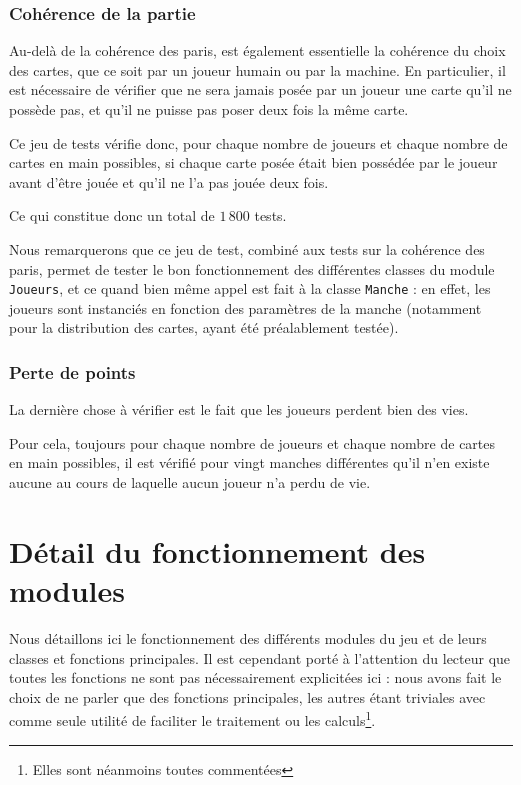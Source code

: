       \subsubsection{Cohérence de la partie}
         Au-delà de la cohérence des paris, est également essentielle la cohérence du choix des cartes, que ce soit par un joueur humain ou par la machine.
         En particulier, il est nécessaire de vérifier que ne sera jamais posée par un joueur une carte qu'il ne possède pas, et qu'il ne puisse pas poser deux fois la même carte.

         Ce jeu de tests vérifie donc, pour chaque nombre de joueurs et chaque nombre de cartes en main possibles, si chaque carte posée était bien possédée par le joueur avant d'être jouée et qu'il ne l'a pas jouée deux fois.

         Ce qui constitue donc un total de $1\,800$ tests.

         Nous remarquerons que ce jeu de test, combiné aux tests sur la cohérence des paris, permet de tester le bon fonctionnement des différentes classes du module \texttt{Joueurs}, et ce quand bien même appel est fait à la classe \texttt{Manche} : en effet, les joueurs sont instanciés en fonction des paramètres de la manche (notamment pour la distribution des cartes, ayant été préalablement testée).

      \subsubsection{Perte de points}
         La dernière chose à vérifier est le fait que les joueurs perdent bien des vies.

         Pour cela, toujours pour chaque nombre de joueurs et chaque nombre de cartes en main possibles, il est vérifié pour vingt manches différentes qu'il n'en existe aucune au cours de laquelle aucun joueur n'a perdu de vie.

\section{Détail du fonctionnement des modules}\label{sec:détail-du-fonctionnement-par-module}
   Nous détaillons ici le fonctionnement des différents modules du jeu et de leurs classes et fonctions principales.
   Il est cependant porté à l'attention du lecteur que toutes les fonctions ne sont pas nécessairement explicitées ici : nous avons fait le choix de ne parler que des fonctions principales, les autres étant triviales avec comme seule utilité de faciliter le traitement ou les calculs\footnote{Elles sont néanmoins toutes commentées}.
